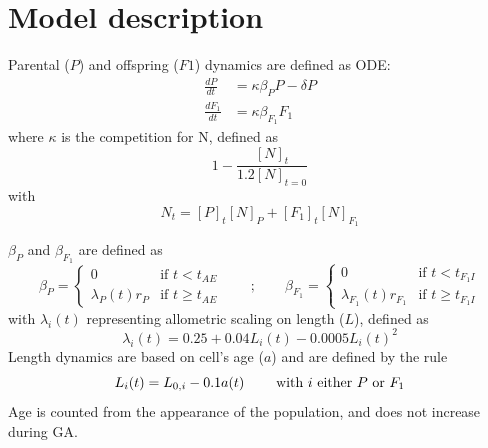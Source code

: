 \documentclass[a4paper,oneside]{article}
\begin{document}
  \section*{Model description}
    Parental ($P$) and offspring ($F1$) dynamics are defined as ODE:\@
    \begin{align}
      \frac{dP}{dt}     &= \kappa \beta_{P} P - \delta P \\
      \frac{dF_{1}}{dt} &= \kappa \beta_{F_{1}} F_{1}
    \end{align}
    where $\kappa$ is the competition for N, defined as
    \[
      1 - \frac{{[N]}_{t}}{1.2{[N]}_{t=0}}
    \]
    with 
    \[
      N_{t} = {[P]}_{t} {[N]}_{P} + {[F_{1}]}_{t} {[N]}_{F_{1}}
    \]

    $\beta_{P}$ and $\beta_{F_{1}}$ are defined as
    \[
      \beta_{P} =
        \begin{cases}
          0                    & \mbox{if } t <    t_{AE} \\
          \lambda_{P}(t) r_{P} & \mbox{if } t \geq t_{AE}
        \end{cases}
      \qquad;\qquad
      \beta_{F_{1}} = 
        \begin{cases}
          0                            & \mbox{if } t <    t_{F_{1}I} \\
          \lambda_{F_{1}}(t) r_{F_{1}} & \mbox{if } t \geq t_{F_{1}I}
        \end{cases}
    \]
    with $\lambda_i(t)$ representing allometric scaling on length ($L$), defined as
    \[
      \lambda_{i}(t) = 0.25 + 0.04 L_{i}(t) - 0.0005 L_{i}{(t)}^{2}
    \]
    Length dynamics are based on cell's age ($a$) and are defined by the rule
    \[
      L_{i}(t) = L_{0,i} - 0.1 a(t) \hspace{8mm}\text{with $i$ either $P$ or $F_{1}$}
    \]
    Age is counted from the appearance of the population, and does not increase during GA.\@
\end{document}

